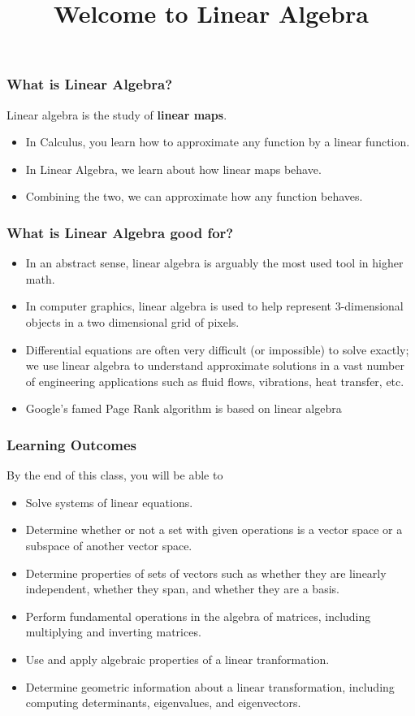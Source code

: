 \documentclass{beamer}
\title{Welcome to Linear Algebra}
\author{\prof}
\date{\ifbool{TR}{August 17, 2017}{August 16,2017}}
\begin{document}
\begin{frame}
\titlepage
\end{frame}

\begin{frame} \frametitle{What is Linear Algebra? }
Linear algebra is the study of {\bf linear maps}.
\begin{itemize}
\item In Calculus, you learn how to approximate any function by a linear function.
\item In Linear Algebra, we learn about how linear maps behave.
\item Combining the two, we can approximate how any function behaves.
\end{itemize}
\end{frame}

\begin{frame} \frametitle{What is Linear Algebra good for?}
\begin{itemize}
\item In an abstract sense, linear algebra is arguably the most used tool in higher math.
\item In computer graphics, linear algebra is used to help represent 3-dimensional objects in a two dimensional grid of pixels.
\item Differential equations are often very difficult (or impossible) to solve exactly; we use linear algebra to understand approximate solutions in a vast number of engineering applications such as fluid flows, vibrations, heat transfer, etc.
\item Google's famed Page Rank algorithm is based on linear algebra
\end{itemize}
\end{frame}

\begin{frame} \frametitle{Learning Outcomes }
By the end of this class, you will be able to
\begin{itemize}
\item Solve systems of linear equations.
\pause \item Determine whether or not a set with given operations is a vector space or a subspace of another vector space.
\pause \item Determine properties of sets of vectors such as whether they are linearly independent, whether they span, and whether they are a basis.
\pause \item Perform fundamental operations in the algebra of matrices, including multiplying and inverting matrices.
\pause \item Use and apply algebraic properties of a linear tranformation.
\pause \item Determine geometric information about a linear transformation, including computing determinants, eigenvalues, and eigenvectors.
\end{itemize}
\end{frame}
\end{document}
